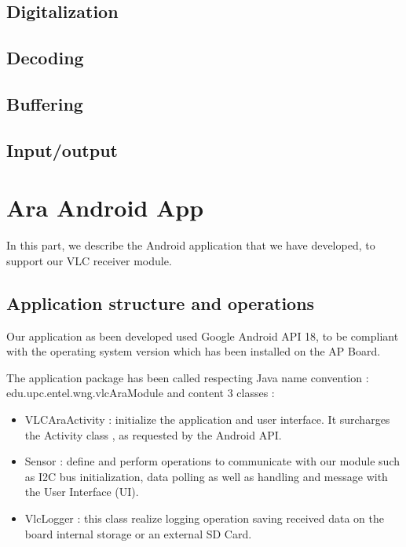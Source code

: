 \subsection{Digitalization}
\subsection{Decoding}
\subsection{Buffering}
\subsection{Input/output}


\section{Ara Android App}

In this part, we describe the Android application that we have developed, to support our VLC receiver module.

\subsection{Application structure and operations}
Our application as been developed used Google Android API 18, to be compliant with the operating system version which has been installed on the AP Board.

The application package has been called respecting Java name convention : edu.upc.entel.wng.vlcAraModule and content 3 classes :

\begin{itemize}
\item VLCAraActivity : initialize the application and user interface. It surcharges the Activity class , as requested by the Android API.
\item Sensor : define and perform operations to communicate with our module such as I2C bus initialization, data polling as well as handling and message with the User Interface (UI).
\item VlcLogger : this class realize logging operation saving received data on the board internal storage or an external SD Card.
\end{itemize}

